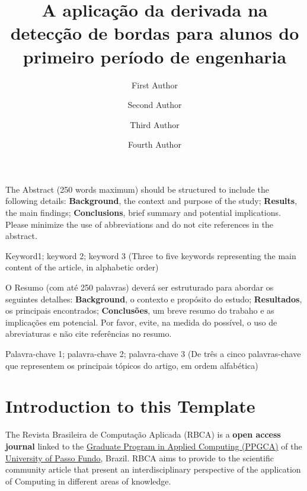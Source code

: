 \documentclass[a4paper,alpha-refs]{RBCA_v1.0}
\title{A aplicação da derivada na detecção de bordas para alunos do primeiro período de engenharia}
\author[1]{First Author}
\author[2]{Second Author}
\author[2]{Third Author}
\author[2]{Fourth Author}
\affil[1]{First Institution}
\affil[2]{Second Institution}
\begin{document}
\begin{frontmatter}
	
\maketitle

\begin{Abstract} %
The Abstract (250 words maximum) should be structured to include the following details: \textbf{Background}, the context and purpose of the study; \textbf{Results}, the main findings; \textbf{Conclusions}, brief summary and potential implications. Please minimize the use of abbreviations and do not cite references in the abstract.
\end{Abstract}

\begin{keywords}
Keyword1; keyword 2; keyword 3 (Three to five keywords representing the main content of the article, in alphabetic order)
\end{keywords}

\begin{resumo} %
	O Resumo (com até 250 palavras) deverá ser estruturado para abordar os seguintes detalhes: \textbf{Background}, o contexto e propósito do estudo; \textbf{Resultados}, os principais encontrados; \textbf{Conclusões}, um breve resumo do trabaho e as implicações em potencial. Por favor, evite, na medida do possível, o uso de abreviaturas e não cite referências no resumo.
\end{resumo}

\begin{palavras_chave} %
	Palavra-chave 1; palavra-chave 2; palavra-chave 3 (De três a cinco palavras-chave que representem os principais tópicos do artigo, em ordem alfabética)
\end{palavras_chave}

\end{frontmatter}


\section{Introduction to this Template}

The Revista Brasileira de Computação Aplicada (RBCA) is a \textbf{open access journal} linked to the \href{http://ppgca.upf.br}{Graduate Program in Applied Computing (PPGCA)} of the \href{http://www.upf.br}{University of Passo Fundo}, Brazil. RBCA aims to provide to the scientific community article that present an interdisciplinary perspective of the application of Computing in different areas of knowledge.
\end{document}
